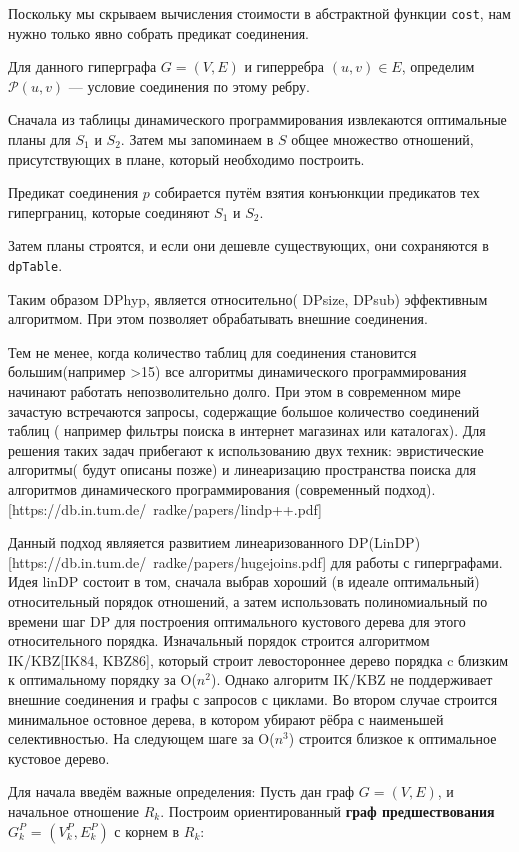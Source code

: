 \documentclass[12pt]{article}
\begin{document}
\begin{flushleft}
Поскольку мы скрываем вычисления стоимости  
в абстрактной функции \texttt{cost},  
нам нужно только явно собрать предикат соединения.  

Для данного гиперграфа $G = (V, E)$  
и гиперребра $(u, v) \in E$,  
определим $\mathcal{P}(u, v)$ —  
условие соединения по этому ребру.  

Сначала из таблицы динамического программирования  
извлекаются оптимальные планы для $S_1$ и $S_2$.  
Затем мы запоминаем в $S$ общее множество отношений,  
присутствующих в плане, который необходимо построить.  

Предикат соединения $p$ собирается  
путём взятия конъюнкции предикатов тех гиперграниц,  
которые соединяют $S_1$ и $S_2$.  

Затем планы строятся,  
и если они дешевле существующих,  
они сохраняются в \texttt{dpTable}.

Таким образом DPhyp, является относительно( DPsize, DPsub) эффективным алгоритмом.
При этом позволяет обрабатывать внешние соединения.

Тем не менее, когда количество таблиц для соединения становится большим(например >15) все алгоритмы динамического 
программирования начинают работать непозволительно долго. При этом в современном мире зачастую встречаются запросы, 
содержащие большое количество соединений таблиц ( например фильтры поиска в интернет магазинах или каталогах). Для решения 
таких задач прибегают к использованию двух техник: эвристические алгоритмы( будут описаны позже) и линеаризацию пространства 
поиска для алгоритмов динамического программирования (современный подход).
[https://db.in.tum.de/~radke/papers/lindp++.pdf]

Данный подход являяется развитием линеаризованного DP(LinDP)[https://db.in.tum.de/~radke/papers/hugejoins.pdf] для работы с 
гиперграфами. Идея linDP состоит в том,  сначала выбрав хороший (в идеале оптимальный)
относительный порядок отношений, а затем использовать полиномиальный по времени шаг DP
для построения оптимального кустового дерева для этого относительного порядка. Изначальный 
порядок строится алгоритмом IK/KBZ[IK84, KBZ86], который строит левостороннее дерево порядка c близким 
к оптимальному порядку за O($n^2$). Однако алгоритм IK/KBZ не поддерживает внешние соединения и графы с запросов с циклами.
Во втором случае строится минимальное остовное дерева, в котором убирают рёбра с наименьшей селективностью.
На следующем шаге за O($n^3$) строится близкое к оптимальное кустовое дерево.

Для начала введём важные определения:
Пусть дан граф $G = (V, E)$, и начальное отношение
$R_k$. Построим ориентированный \textbf{граф предшествования}
$G^{P}_k$ = $(V^{P}_k, E^{P}_k)$  с корнем в $R_k$:


\end{flushleft}
\end{document}
